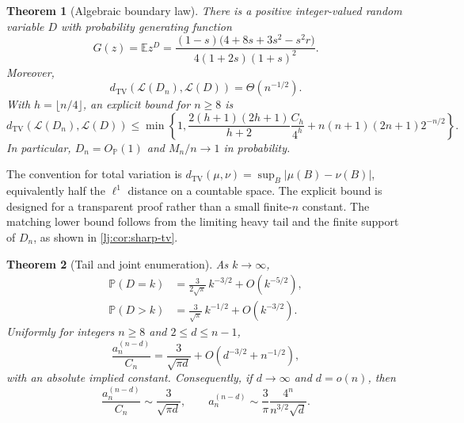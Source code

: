 \documentclass[11pt,a4paper]{article}
\newtheorem{theorem}{Theorem}[section]
\theoremstyle{definition}\newaliascnt{definition}{theorem}
\theoremstyle{remark}\newaliascnt{remark}{theorem}
\newcommand{\ljP}{\mathbb P}
\newcommand{\ljE}{\mathbb E}
\newcommand{\ljTV}{d_{\mathrm{TV}}}
\newcommand{\ljLaw}{\mathcal L}
\begin{document}
\begin{theorem}[Algebraic boundary law]\label{lj:thm:main}
There is a positive integer-valued random variable $D$ with probability
generating function
\begin{equation}
 \boxed{\displaystyle
 G(z)=\ljE z^D=
 \frac{(1-s)\bigl(4+8s+3s^2-s^2r\bigr)}
      {4(1+2s)(1+s)^2}.}
 \label{lj:eq:main-pgf}
\end{equation}
Moreover,
\begin{equation}
 \ljTV(\ljLaw(D_n),\ljLaw(D))=\Theta(n^{-1/2}).
 \label{lj:eq:main-tv}
\end{equation}
With $h=\lfloor n/4\rfloor$, an explicit bound for $n\ge8$ is
\begin{equation}
 \ljTV(\ljLaw(D_n),\ljLaw(D))\le
 \min\left\{1,
 \frac{2(h+1)(2h+1)}{h+2}\frac{C_h}{4^h}
 +n(n+1)(2n+1)2^{-n/2}\right\}.
 \label{lj:eq:explicit-tv}
\end{equation}
In particular, $D_n=O_{\ljP}(1)$ and $M_n/n\to1$ in probability.
\end{theorem}

The convention for total variation is
$\ljTV(\mu,\nu)=\sup_B|\mu(B)-\nu(B)|$, equivalently half the
$\ell^1$ distance on a countable space. The explicit bound is designed for a
transparent proof rather than a small finite-$n$ constant. The matching
lower bound follows from the limiting heavy tail and the finite support
of $D_n$, as shown in \cref{lj:cor:sharp-tv}.

\begin{theorem}[Tail and joint enumeration]\label{lj:thm:tail-main}
As $k\to\infty$,
\begin{align}
 \ljP(D=k)&=\frac{3}{2\sqrt\pi}\,k^{-3/2}
          +O(k^{-5/2}),\label{lj:eq:pmf-leading}\\
 \ljP(D>k)&=\frac{3}{\sqrt\pi}\,k^{-1/2}
          +O(k^{-3/2}).\label{lj:eq:tail-leading}
\end{align}
Uniformly for integers $n\ge8$ and $2\le d\le n-1$,
\begin{equation}
 \frac{a_n^{(n-d)}}{C_n}
 =\frac{3}{\sqrt{\pi d}}+O(d^{-3/2}+n^{-1/2}),
 \label{lj:eq:uniform-joint}
\end{equation}
with an absolute implied constant. Consequently, if $d\to\infty$ and
$d=o(n)$, then
\begin{equation}
 \frac{a_n^{(n-d)}}{C_n}\sim\frac{3}{\sqrt{\pi d}},
 \qquad
 a_n^{(n-d)}\sim\frac{3}{\pi}\frac{4^n}{n^{3/2}\sqrt d}.
 \label{lj:eq:joint-equivalent}
\end{equation}
\end{theorem}
\end{document}
